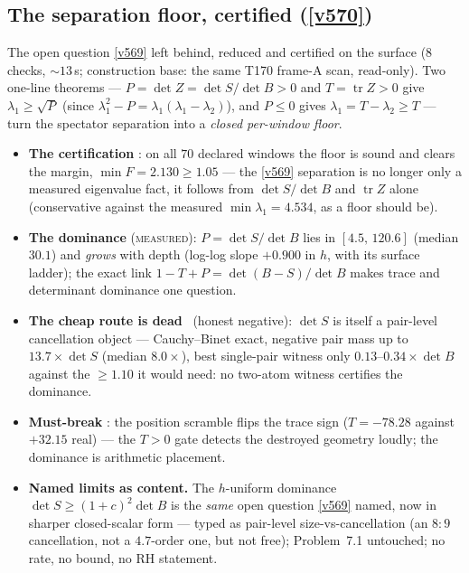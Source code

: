 \documentclass[11pt,a4paper]{article}
\begin{document}
\subsection{The separation floor, certified (\texorpdfstring{\vref{v570}}{v570})}\label{sec:v570}
The open question \vref{v569} left behind, reduced and certified on the
surface  ($8$ checks, ${\sim}13$\,s;
construction base: the same T170 frame-A scan, read-only). Two one-line
theorems --- $P=\det Z=\det S/\det B>0$ and $T=\operatorname{tr}Z>0$ give
$\lambda_1\ge\sqrt P$ (since $\lambda_1^2-P=\lambda_1(\lambda_1-\lambda_2)$),
and $P\le0$ gives $\lambda_1=T-\lambda_2\ge T$ --- turn the spectator
separation into a \emph{closed per-window floor}.

\begin{itemize}[leftmargin=1.5em]
\item \textbf{The certification} \mE: on all $70$ declared windows the floor
is sound and clears the margin, $\min F=2.130\ge1.05$ --- the \vref{v569}
separation is no longer only a measured eigenvalue fact, it follows from
$\det S/\det B$ and $\operatorname{tr}Z$ alone (conservative against the
measured $\min\lambda_1=4.534$, as a floor should be).
\item \textbf{The dominance} (\textsc{measured}): $P=\det S/\det B$ lies in
$[4.5,\,120.6]$ (median $30.1$) and \emph{grows} with depth (log-log slope
$+0.900$ in $h$, with its surface ladder); the exact link
$1-T+P=\det(B-S)/\det B$ makes trace and determinant dominance one question.
\item \textbf{The cheap route is dead} \mE\ (honest negative): $\det S$ is
itself a pair-level cancellation object --- Cauchy--Binet exact, negative
pair mass up to $13.7\times\det S$ (median $8.0\times$), best single-pair
witness only $0.13$--$0.34\times\det B$ against the $\ge1.10$ it would need:
no two-atom witness certifies the dominance.
\item \textbf{Must-break} \mE: the position scramble flips the trace sign
($T=-78.28$ against $+32.15$ real) --- the $T>0$ gate detects the destroyed
geometry loudly; the dominance is arithmetic placement.
\item \textbf{Named limits as content.} The $h$-uniform dominance
$\det S\ge(1+c)^2\det B$ is the \emph{same} open question \vref{v569} named,
now in sharper closed-scalar form --- typed as pair-level
size-vs-cancellation (an $8{:}9$ cancellation, not a $4.7$-order one, but
not free); Problem~7.1 untouched; no rate, no bound, no RH statement.
\end{itemize}
\end{document}
